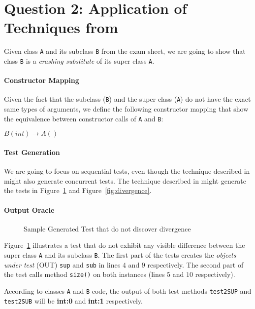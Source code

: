 \section*{Question 2: Application of Techniques from \cite{Pradel:2013:ATS}}

\newcommand{\myA}{\texttt{A}}
\newcommand{\myB}{\texttt{B}}
\newcommand{\myout}{OUT}

Given class \myA{} and its subclass \myB{} from the exam
sheet, we are going to show that class \myB{} is a
\textit{crashing substitute} of its super class \myA{}.

\paragraph*{Constructor Mapping}
Given the fact that the subclass (\myB{}) and the super
class (\myA{}) do not have the exact same types of arguments,
we define the following constructor mapping that show the
equivalence between constructor calls of \myA{} and \myB{}:\

$\mathit{B}(int) \rightarrow \mathit{A}()$

\paragraph*{Test Generation}
We are going to focus on sequential tests, even though the technique
described in \cite{Pradel:2013:ATS} might also generate concurrent
tests.
The technique described in \cite{Pradel:2013:ATS} might generate
the tests in Figure~\ref{fig:test} and Figure~\ref{fig:divergence}.

\paragraph*{Output Oracle}
\begin{figure}[!ht]
\caption{Sample Generated Test that do not discover divergence}
\label{fig:test}
\end{figure}

Figure~\ref{fig:test} illustrates a test that do not exhibit
any visible difference between the super class \myA{} and its subclass
\myB{}. The first part of the tests creates the
\textit{objects under test} (\myout{}) \texttt{sup} and \texttt{sub}
in lines $4$ and $9$ respectively.
The second part of the test calls method \texttt{size()} on both instances
(lines $5$ and $10$ respectively).

According to classes \myA{} and \myB{} code, the output of
both test methods \texttt{test2SUP} and \texttt{test2SUB} will
be \textbf{int:0} and \textbf{int:1} respectively.

